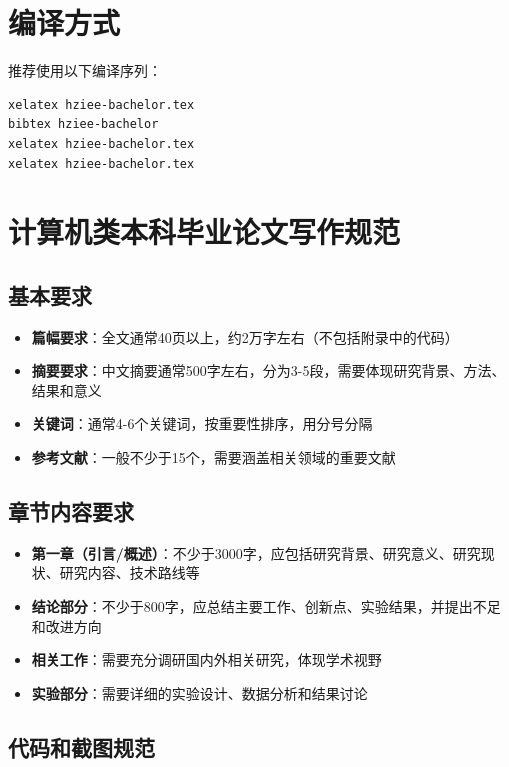 \documentclass
  [
    math-font    = STIX Two Math, agreed,
    CJKmain-font = { {Songti SC}[AutoFakeBold = 2.5, AutoFakeSlant] },
    CJKsans-font = { {STHeiti}[AutoFakeBold = 2] }
  ] {hduthesis}
\begin{document}
\section{编译方式}

推荐使用以下编译序列：
\begin{verbatim}
xelatex hziee-bachelor.tex
bibtex hziee-bachelor
xelatex hziee-bachelor.tex
xelatex hziee-bachelor.tex
\end{verbatim}

\section{计算机类本科毕业论文写作规范}

\subsection{基本要求}

\begin{itemize}
\item \textbf{篇幅要求}：全文通常40页以上，约2万字左右（不包括附录中的代码）
\item \textbf{摘要要求}：中文摘要通常500字左右，分为3-5段，需要体现研究背景、方法、结果和意义
\item \textbf{关键词}：通常4-6个关键词，按重要性排序，用分号分隔
\item \textbf{参考文献}：一般不少于15个，需要涵盖相关领域的重要文献
\end{itemize}

\subsection{章节内容要求}

\begin{itemize}
\item \textbf{第一章（引言/概述）}：不少于3000字，应包括研究背景、研究意义、研究现状、研究内容、技术路线等
\item \textbf{结论部分}：不少于800字，应总结主要工作、创新点、实验结果，并提出不足和改进方向
\item \textbf{相关工作}：需要充分调研国内外相关研究，体现学术视野
\item \textbf{实验部分}：需要详细的实验设计、数据分析和结果讨论
\end{itemize}

\subsection{代码和截图规范}
\end{document}
